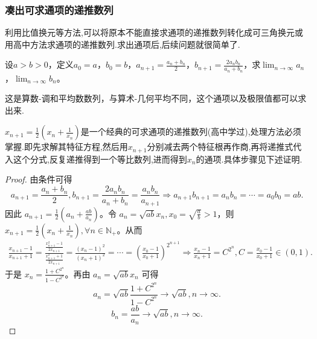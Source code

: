 \documentclass[../../main.tex]{subfiles}
\begin{document}
\subsubsection{凑出可求通项的递推数列}

利用比值换元等方法,可以将原本不能直接求通项的递推数列转化成可三角换元或用高中方法求通项的递推数列.求出通项后,后续问题就很简单了.

\begin{example}
设\(a > b>0\)，定义\(a_0 = a\)，\(b_0 = b\)，\(a_{n + 1}=\frac{a_n + b_n}{2}\)，\(b_{n + 1}=\frac{2a_nb_n}{a_n + b_n}\)，求\(\lim_{n\rightarrow\infty}a_n\)，\(\lim_{n\rightarrow\infty}b_n\)。
\end{example}
\begin{remark}
这是算数-调和平均数数列，与算术-几何平均不同，这个通项以及极限值都可以求出来.
\end{remark}\begin{note}
\(x_{n + 1}=\frac{1}{2}\left(x_n+\frac{1}{x_n}\right)\)是一个经典的可求通项的递推数列(高中学过),处理方法必须掌握.即先求解其特征方程,然后用$x_{n+1}$分别减去两个特征根再作商,再将递推式代入这个分式,反复递推得到一个等比数列,进而得到$x_n$的通项.具体步骤见下述证明.
\end{note}
\begin{proof}
由条件可得
\[
a_{n + 1}=\frac{a_n + b_n}{2},b_{n + 1}=\frac{2a_nb_n}{a_n + b_n}=\frac{a_nb_n}{a_{n + 1}}\Rightarrow a_{n + 1}b_{n + 1}=a_nb_n=\cdots =a_0b_0 = ab.
\]
因此 \(a_{n + 1}=\frac{1}{2}\left(a_n+\frac{ab}{a_n}\right)\)。令 \(a_n=\sqrt{ab}x_n,x_0=\sqrt{\frac{a}{b}}>1\)，则 \(x_{n + 1}=\frac{1}{2}\left(x_n+\frac{1}{x_n}\right),\forall n\in \mathbb{N}_+\)。从而
\begin{align*}
\frac{x_{n + 1}-1}{x_{n + 1}+1}=\frac{\frac{x_{n + 1}^2 - 1}{2x_{n + 1}}}{\frac{x_{n + 1}^2 + 1}{2x_{n + 1}}}
=\frac{(x_n - 1)^2}{(x_n + 1)^2}
=\cdots
=\left(\frac{x_0 - 1}{x_0 + 1}\right)^{2^{n + 1}}\Rightarrow \frac{x_n - 1}{x_n + 1}=C^{2^n},C=\frac{x_0 - 1}{x_0 + 1}\in(0,1).
\end{align*}
于是 \(x_n=\frac{1 + C^{2^n}}{1 - C^{2^n}}\)。再由 \(a_n=\sqrt{ab}x_n\) 可得
\[
a_n=\sqrt{ab}\frac{1 + C^{2^n}}{1 - C^{2^n}}\rightarrow\sqrt{ab},n\rightarrow\infty.
\]
\[
b_n=\frac{ab}{a_n}\rightarrow\sqrt{ab},n\rightarrow\infty.
\]
\end{proof}
\end{document}
